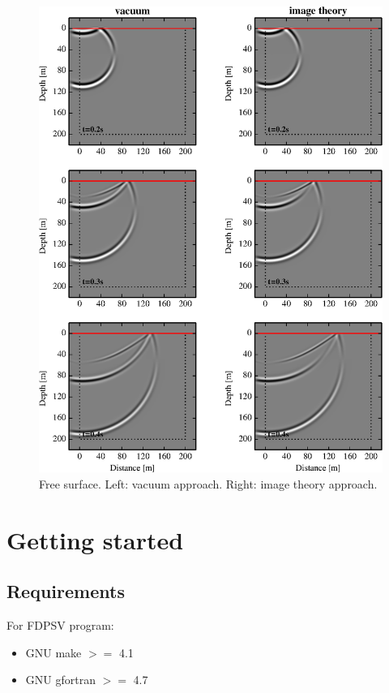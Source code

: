\documentclass{gnulike}
\begin{document}
\begin{figure}[!ht]
  \centering
  \includegraphics[scale=1.0]{fig/validation_fsurf.eps}
  \caption{Free surface. Left: vacuum approach. Right: image theory approach.}
\end{figure}

\chapter{Getting started}

\section{Requirements}

\noindent For FDPSV program:
\begin{itemize}
	\item GNU make $>=$ 4.1
	\item GNU gfortran $>=$ 4.7
\end{itemize}
\end{document}
